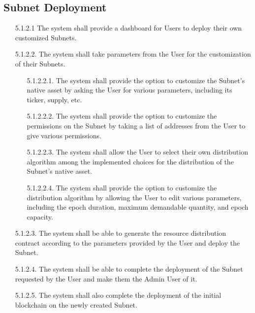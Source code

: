 \documentclass[a4paper,12pt]{report}
\begin{document}
\subsection{Subnet Deployment}
\begin{itemize}
	\item [5.1.2.1]
	The system shall provide a dashboard for Users to deploy their own customized Subnets.
	\\
	\item [5.1.2.2.]
	The system shall take parameters from the User for the customization of their Subnets.
	\begin{itemize}
		\item [5.1.2.2.1.]
		The system shall provide the option to customize the Subnet’s native asset by asking the User for various parameters, including its ticker, supply, etc.
		\item [5.1.2.2.2.]
		The system shall provide the option to customize the permissions on the Subnet by taking a list of addresses from the User to give various permissions.
		\newpage
		\item [5.1.2.2.3.]
		The system shall allow the User to select their own distribution algorithm among the implemented choices for the distribution of the Subnet’s native asset.
		\item [5.1.2.2.4.]
		The system shall provide the option to customize the distribution algorithm by allowing the User to edit various parameters, including the epoch duration, maximum demandable quantity, and epoch capacity.
		\\
	\end{itemize}
	\item [5.1.2.3.]
	The system shall be able to generate the resource distribution contract according to the parameters provided by the User and deploy the Subnet.
	\\
	\item [5.1.2.4.]
	The system shall be able to complete the deployment of the Subnet requested by the User and make them the Admin User of it.
	\\
	\item [5.1.2.5.]
	The system shall also complete the deployment of the initial blockchain on the newly created Subnet.
\end{itemize}
\end{document}
